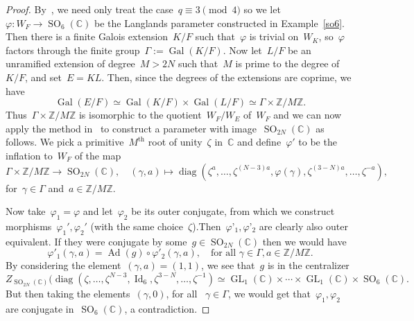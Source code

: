\documentclass[12pt]{amsart}
\newcommand{\BC}{\mathbb {C}}
\newcommand{\BZ}{\mathbb {Z}}
\newcommand{\Ad}{\operatorname{Ad}}
\newcommand{\Gal}{\operatorname{Gal}}
\newcommand{\GL}{\operatorname{GL}}
\newcommand{\Id}{\operatorname{Id}}
\newcommand{\SO}{\operatorname{SO}}
\def\diag{\operatorname{diag}}
\begin{document}
\begin{proof}
By~\cite[Proposition~7.3]{M24}, we need only treat the case~$q\equiv 3\pmod 4$ so we let~$\varphi:W_F \to\SO_6(\BC)$ be the Langlands parameter constructed in Example~\ref{so6}. Then there is a finite Galois extension~$K/F$ such that~$\varphi$ is trivial on~$W_K$, so~$\varphi$ factors through the finite group~$\Gamma:=\Gal(K/F)$. Now let~$L/F$ be an unramified extension of degree~$M>2N$ such that~$M$ is prime to the degree of~$K/F$, and set~$E=KL$. Then, since the degrees of the extensions are coprime, we have
\[ 
\Gal(E/F) \simeq \Gal(K/F)\times \Gal(L/F) \simeq \Gamma \times \BZ/M\BZ.
 \]
Thus~$\Gamma\times\BZ/M\BZ$ is isomorphic to the quotient~$W_F/W_E$ of~$W_F$ and we can now apply the method in~\cite[Lemma~2.3]{Yu22} to construct a parameter with image~$\SO_{2N}(\BC)$ as follows. We pick a primitive~$M^\text{th}$ root of unity~$\zeta$ in~$\BC$ and define~$\varphi'$ to be the inflation to~$W_F$ of the map
\[
\Gamma \times \BZ/M\BZ \to \SO_{2N}(\BC), \quad (\gamma, a) \mapsto \diag( \zeta^a, \ldots ,\zeta^{(N-3)a}, \varphi(\gamma), \zeta^{(3-N)a},\ldots, \zeta^{-a}),
\]
 for~$\gamma\in\Gamma$ and~$a\in\BZ/M\BZ$.


Now take~$\varphi_1=\varphi$ and let~$\varphi_2$ be its outer conjugate, from which we construct morphisms~$\varphi_1',\varphi_2'$ (with the same choice~$\zeta$).Then~$\varphi’_1,\varphi’_2$ are clearly also outer equivalent. If they were conjugate by some~$g\in\SO_{2N}(\BC)$ then we would have
\[
\varphi'_1(\gamma,a)=\Ad(g)\circ \varphi'_2(\gamma,a), \quad\text{for all }\gamma\in\Gamma, a\in\BZ/M\BZ.
\]
By considering the element~$(\gamma,a)=(1,1)$, we see that~$g$ is in the centralizer
\[ 
Z_{\SO_{2N}(\BC)}( \diag( \zeta, \ldots ,\zeta^{N-3}, \Id_6 , \zeta^{3-N},\ldots, \zeta^{-1}) \simeq \GL_1(\BC) \times \cdots \times \GL_1(\BC) \times \SO_6(\BC).
\]
But then taking the elements~$(\gamma,0)$, for all ~$\gamma\in\Gamma$, we would get that~$\varphi_1,\varphi_2$ are conjugate in~$\SO_6(\BC)$, a contradiction. 

\end{proof}
\end{document}
